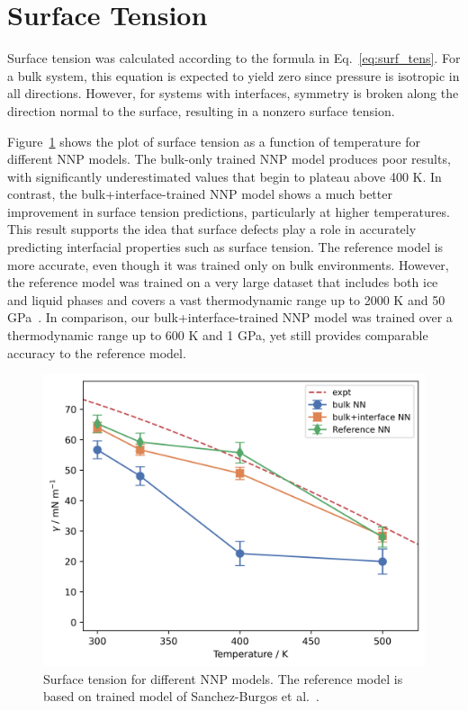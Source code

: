 \section{Surface Tension}
Surface tension was calculated according to the formula in Eq.~\eqref{eq:surf_tens}. For a bulk system, this equation is expected to yield zero since pressure is isotropic in all directions. However, for systems with interfaces, symmetry is broken along the direction normal to the surface, resulting in a nonzero surface tension.

Figure~\ref{fig:surf_tens} shows the plot of surface tension as a function of temperature for different NNP models. The bulk-only trained NNP model produces poor results, with significantly underestimated values that begin to plateau above 400 K. In contrast, the bulk+interface-trained NNP model shows a much better improvement in surface tension predictions, particularly at higher temperatures. This result supports the idea that surface defects play a role in accurately predicting interfacial properties such as surface tension. The reference model is more accurate, even though it was trained only on bulk environments. However, the reference model was trained on a very large dataset that includes both ice and liquid phases and covers a vast thermodynamic range up to 2000 K and 50 GPa~\cite{zhang2021phase}. In comparison, our bulk+interface-trained NNP model was trained over a thermodynamic range up to 600 K and 1 GPa, yet still provides comparable accuracy to the reference model.


\begin{figure}[h!]
	\centering
	\includegraphics[width=0.7\linewidth]{images/surface_tension.png}
	\caption{Surface tension for different NNP models. The
		reference model is based on trained model of Sanchez-Burgos et
		al.~\cite{sanchez2023deep}.  }\label{fig:surf_tens}
\end{figure}

